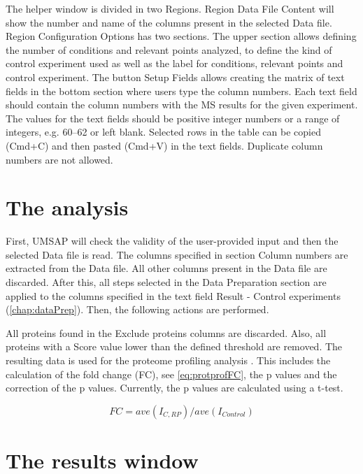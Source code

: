 The helper window is divided in two Regions. Region Data File Content will show the
number and name of the columns present in the selected Data file. Region
Configuration Options has two sections. The upper section allows defining the number
of conditions and relevant points analyzed, to define the kind of control experiment
used as well as the label for conditions, relevant points and control experiment.
The button Setup Fields allows creating the matrix of text fields in the bottom section
where users type the column numbers. Each text field should contain the column
numbers with the MS results for the given experiment. The values for the text fields
should be positive integer numbers or a range of integers, e.g.
\numrange[range-phrase=--]{60}{62} or left blank. Selected rows in the table can
be copied (Cmd+C) and then pasted (Cmd+V) in the text fields. Duplicate column numbers
are not allowed.

\section{The analysis}
\label{sec:protprofTTest}

First, UMSAP will check the validity of the user-provided input and then the selected
Data file is read. The columns specified in section Column numbers are extracted
from the Data file. All other columns present in the Data file are discarded. After
this, all steps selected in the Data Preparation section are applied to the columns
specified in the text field Result - Control experiments (\autoref{chap:dataPrep}).
Then, the following actions are performed.

All proteins found in the Exclude proteins columns are discarded. Also, all proteins
with a Score value lower than the defined threshold are removed. The resulting data
is used for the proteome profiling analysis \cite{Aguilan2020}. This includes the
calculation of the fold change (FC), see \autoref{eq:protprofFC}, the p values and the correction
of the p values. Currently, the p values are calculated using a t-test.

\begin{equation}
\label{eq:protprofFC}
FC = ave(I_{C, RP}) / ave(I_{Control})
\end{equation}

\section{The results window}


